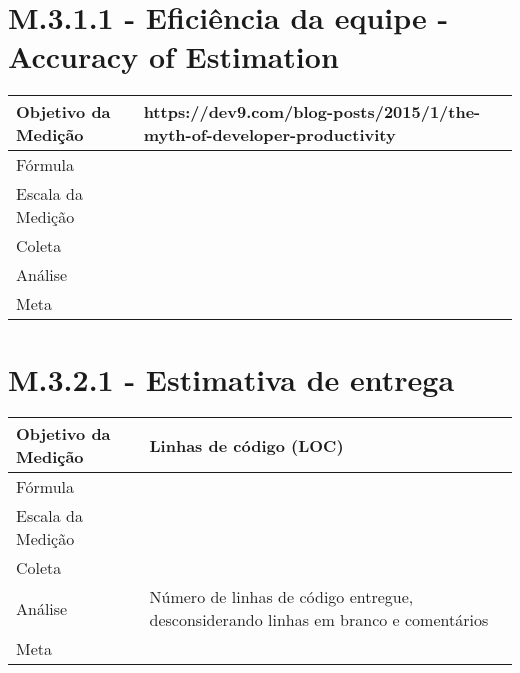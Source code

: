 \section{M.3.1.1 - Eficiência da equipe - Accuracy of Estimation} %

	\begin{tabular}{ |p{5cm}|p{5cm}|  }
	 \hline
	 Objetivo da Medição 		& https://dev9.com/blog-posts/2015/1/the-myth-of-developer-productivity  	   \\
	 \hline
	 Fórmula		& 		\\
	 \hline
	 Escala da Medição 		& 		 \\
	 \hline
	 Coleta		& 		\\
	 \hline
	 Análise		& 		 \\
	 \hline
	 Meta		& 		 \\
	 \hline
	\end{tabular}


\section{M.3.2.1 - Estimativa de entrega} %

	\begin{tabular}{ |p{5cm}|p{5cm}|  }
	 \hline
	 Objetivo da Medição 		& Linhas de código (LOC)	   \\
	 \hline
	 Fórmula		& 		\\
	 \hline
	 Escala da Medição 		& 		 \\
	 \hline
	 Coleta		& 		\\
	 \hline
	 Análise		& Número de linhas de código entregue, desconsiderando linhas em branco e comentários \\
	 \hline
	 Meta		& 		 \\
	 \hline
	\end{tabular}